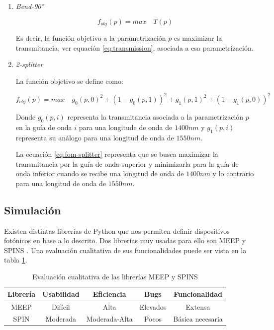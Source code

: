 \begin{enumerate}

\item \emph{Bend-90°}

\begin{equation}
f_{obj}(p) = max \quad T(p)
\label{eq:fom-bend}
\end{equation}

Es decir, la función objetivo a la parametrización $p$ es maximizar la transmitancia, ver equación \ref{eq:transmission}, asociada a esa parametrización.

\item \emph{2-splitter}

La función objetivo se define como:

\begin{equation}
  f_{obj}(p) = max \quad g_0(p, 0)^2 + (1 - g_0(p, 1))^2 + g_1(p, 1)^2 + (1 - g_1(p, 0))^2
\label{eq:fom-splitter}
\end{equation}

Donde $g_0(p, i)$ representa la transmitancia asociada a la parametrización $p$ en la guía de onda $i$ para una longitude de onda de $1400 nm$ y 
      $g_1(p, i)$ representa su análogo para una longitud de onda de $1550 nm$.

La ecuación \ref{eq:fom-splitter} representa que se busca maximizar la transmitancia por la guía de onda superior y minimizarla para la guía de onda inferior cuando se recibe una longitud de onda de $1400 nm$ y lo contrario para una longitud de onda de $1550 nm$.

\end{enumerate}

\subsection{Simulación}

Existen distintas librerías de Python que nos permiten definir dispositivos fotónicos en base a lo descrito. 
Dos librerías muy usadas para ello son MEEP \citep{Oskooi2010} y SPINS \citep{Su2020}. 
Una evaluación cualitativa de sus funcionalidades puede ser vista en la tabla \ref{tab:simulation}.

\begin{table}[ht]
    \centering
    \begin{tabular}{|c|c|c|c|c|}
    \hline 
    Librería &  Usabilidad & Eficiencia & Bugs & Funcionalidad \\
    \hline 
    MEEP &  Difícil & Alta & Elevados & Extensa \\
    SPIN &  Moderada  & Moderada-Alta & Pocos & Básica necesaria \\
    \hline 
    \end{tabular}
    \caption{Evaluación cualitativa de las librerías MEEP y SPINS}
    \label{tab:simulation}
\end{table}


